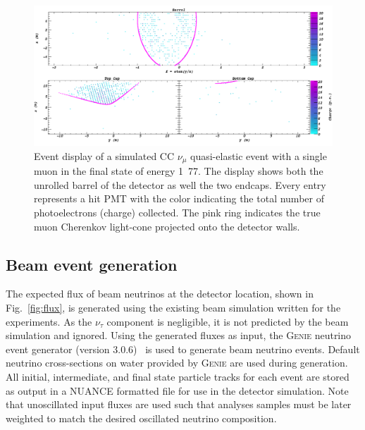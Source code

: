 \begin{figure} %
    \includegraphics[width=\textwidth]{diagrams/4-chips/sim_event.pdf}
    \caption[Event display of a simulated beam CC $\nu_{\mu}$ \chipsfive event]
    {Event display of a simulated CC $\nu_{\mu}$ quasi-elastic event with a single muon in the
        final state of energy \unit{1.77}{\GeV}. The display shows both the unrolled barrel of the
        \chipsfive detector as well the two endcaps. Every entry represents a hit PMT with the
        color indicating the total number of photoelectrons (charge) collected. The pink ring
        indicates the true muon Cherenkov light-cone projected onto the detector walls.}
    \label{fig:sim_event}
\end{figure}

\subsection{Beam event generation} %
\label{sec:chips_monte_carlo_beam} %

The expected flux of beam neutrinos at the \chipsfive detector location, shown in
Fig.~\ref{fig:flux}, is generated using the existing beam simulation written for the \numi
experiments. As the $\nu_{\tau}$ component is negligible, it is not predicted by the beam
simulation and ignored. Using the generated fluxes as input, the \textsc{Genie} neutrino event
generator (version 3.0.6)~\cite{andreopoulos2009, andreopoulos2015} is used to generate beam
neutrino events. Default neutrino cross-sections on water provided by \textsc{Genie} are used
during generation. All initial, intermediate, and final state particle tracks for each event are
stored as output in a NUANCE formatted file for use in the detector simulation. Note that
unoscillated input fluxes are used such that analyses samples must be later weighted to match the
desired oscillated neutrino composition.

